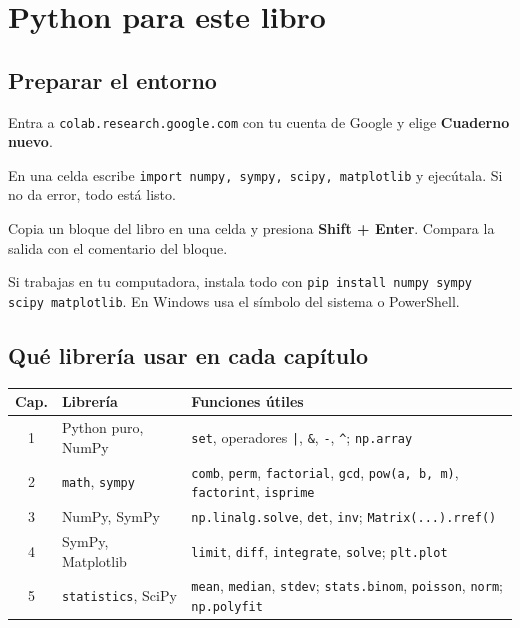 \chapter{Python para este libro}

\section*{Preparar el entorno}
\begin{tmpasos}
\item Entra a \texttt{colab.research.google.com} con tu cuenta de Google y elige \textbf{Cuaderno nuevo}.
\item En una celda escribe \texttt{import numpy, sympy, scipy, matplotlib} y ejec\'utala. Si no da error, todo est\'a listo.
\item Copia un bloque del libro en una celda y presiona \textbf{Shift + Enter}. Compara la salida con el comentario del bloque.
\end{tmpasos}

\begin{tmtip}Si trabajas en tu computadora, instala todo con \texttt{pip install numpy sympy scipy matplotlib}. En Windows usa el s\'imbolo del sistema o PowerShell.\end{tmtip}

\section*{Qu\'e librer\'ia usar en cada cap\'itulo}
\begin{center}
\begin{tabular}{|c|p{3.6cm}|p{7.6cm}|}
\hline
\rowcolor{tmAzulClaro}\textbf{Cap.} & \textbf{Librer\'ia} & \textbf{Funciones \'utiles}\\ \hline
1 & Python puro, NumPy & \texttt{set}, operadores \texttt{|}, \texttt{\&}, \texttt{-}, \texttt{\^{}}; \texttt{np.array}\\ \hline
2 & \texttt{math}, \texttt{sympy} & \texttt{comb}, \texttt{perm}, \texttt{factorial}, \texttt{gcd}, \texttt{pow(a, b, m)}, \texttt{factorint}, \texttt{isprime}\\ \hline
3 & NumPy, SymPy & \texttt{np.linalg.solve}, \texttt{det}, \texttt{inv}; \texttt{Matrix(...).rref()}\\ \hline
4 & SymPy, Matplotlib & \texttt{limit}, \texttt{diff}, \texttt{integrate}, \texttt{solve}; \texttt{plt.plot}\\ \hline
5 & \texttt{statistics}, SciPy & \texttt{mean}, \texttt{median}, \texttt{stdev}; \texttt{stats.binom}, \texttt{poisson}, \texttt{norm}; \texttt{np.polyfit}\\ \hline
\end{tabular}
\end{center}

